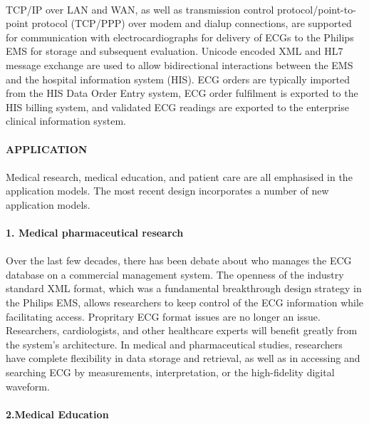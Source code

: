 \documentclass[12pt]{article}
\begin{document}
\paragraph{}TCP/IP over LAN and WAN, as well as transmission control protocol/point-to-point protocol (TCP/PPP) over modem and dialup connections, are supported for communication with electrocardiographs for delivery of ECGs to the Philips EMS for storage and subsequent evaluation.
Unicode encoded XML and HL7 message exchange are used to allow bidirectional interactions between the EMS and the hospital information system (HIS).
ECG orders are typically imported from the HIS Data Order Entry system, ECG order fulfilment is exported to the HIS billing system, and validated ECG readings are exported to the enterprise clinical information system.
\paragraph{\textbf{APPLICATION}}
\paragraph{}Medical research, medical education, and patient care are all emphasised in the application models. The most recent design incorporates a number of new application models.
\paragraph{\textbf{1. Medical pharmaceutical research}}
\paragraph{}Over the last few decades, there has been debate about who manages the ECG database on a commercial management system. The openness of the industry standard XML format, which was a fundamental breakthrough design strategy in the Philips EMS, allows researchers to keep control of the ECG information while facilitating access. Propritary ECG format issues are no longer an issue. Researchers, cardiologists, and other healthcare experts will benefit greatly from the system's architecture. In medical and pharmaceutical studies, researchers have complete flexibility in data storage and retrieval, as well as in accessing and searching ECG by measurements, interpretation, or the high-fidelity digital waveform.
\paragraph{\textbf{2.Medical Education}}
\end{document}
